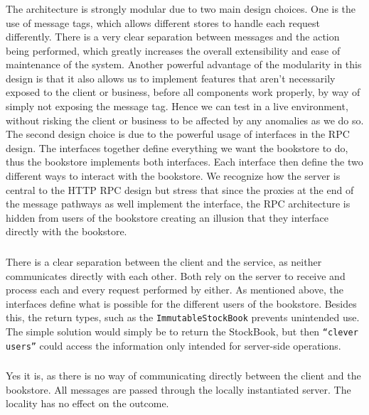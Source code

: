 \subsubsection{}
The architecture is strongly modular due to two main design choices.  One is the use of message tags, which
allows different stores to handle each request differently. There is a very
clear separation between messages and the action being performed, which greatly
increases the overall extensibility and ease of maintenance of the system.
Another powerful advantage of the modularity in this design is that it also
allows us to implement features that aren't necessarily exposed to the client or
business, before all components work properly, by way of simply not exposing the
message tag. Hence we can test in a live environment, without risking the client
or business to be affected by any anomalies as we do so. The second design choice is due to the powerful usage of interfaces in the RPC design. The interfaces together define everything we want the bookstore to do, thus the bookstore implements both interfaces. Each interface then define the two different ways to interact with the bookstore. We recognize how the server is central to the HTTP RPC design but stress that since the proxies at the end of the message pathways as well implement the interface, the RPC architecture is hidden from users of the bookstore creating an illusion that they interface directly with the bookstore.

\subsubsection{}
There is a clear separation between the client and the service, as neither
communicates directly with each other. Both rely on the server to receive and
process each and every request performed by either. As mentioned above, the interfaces define what is possible for the different users of the bookstore. Besides this, the return types, such as the {\tt ImmutableStockBook} prevents unintended use. The simple solution would simply be to return the StockBook, but then {\tt ``clever users''} could access the information only intended for server-side operations.

\subsubsection{}
Yes it is, as there is no way of communicating directly between the client and
the bookstore. All messages are passed through the locally instantiated server.
The locality has no effect on the outcome.

